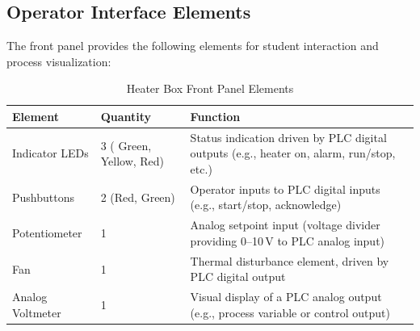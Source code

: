 \documentclass[main.tex]{subfiles}
\begin{document}
\subsection{Operator Interface Elements}

The front panel provides the following elements for student interaction and process visualization:

\begin{table}[H]
\centering
\caption{Heater Box Front Panel Elements}
\label{tab:front-panel}
\begin{tabularx}{\textwidth}{l l X}
\hline
\textbf{Element} & \textbf{Quantity} & \textbf{Function} \\
\hline
Indicator LEDs & 3 ( Green, Yellow,  Red) & Status indication driven by PLC digital outputs (e.g., heater on, alarm, run/stop, etc.) \\
Pushbuttons & 2 (Red, Green) & Operator inputs to PLC digital inputs (e.g., start/stop, acknowledge) \\
Potentiometer & 1 & Analog setpoint input (voltage divider providing 0--10\,V to PLC analog input) \\
Fan & 1 & Thermal disturbance element, driven by PLC digital output \\
Analog Voltmeter & 1 & Visual display of a PLC analog output (e.g., process variable or control output) \\
\hline
\end{tabularx}
\end{table}
\end{document}

